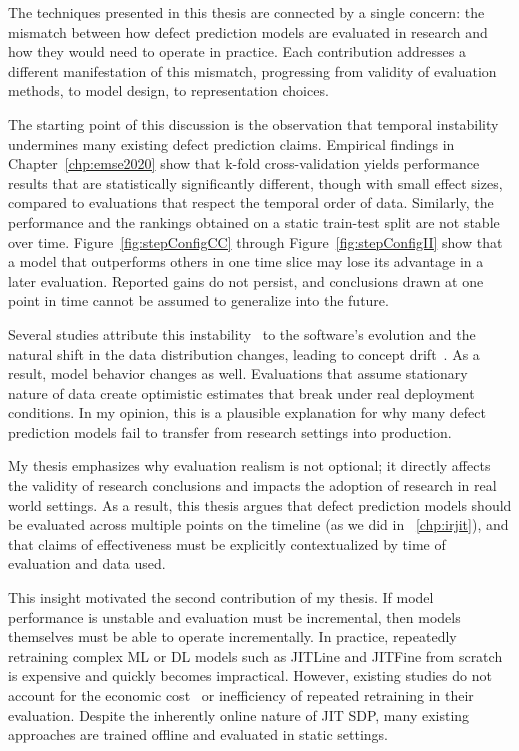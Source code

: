 \documentclass[\main/thesis.tex]{subfiles}
\begin{document}
The techniques presented in this thesis are connected by a single concern: the mismatch between how defect prediction models are evaluated in research and how they would need to operate in practice. Each contribution addresses a different manifestation of this mismatch, progressing from validity of evaluation methods, to model design, to representation choices.

The starting point of this discussion is the observation that temporal instability undermines many existing defect prediction claims. Empirical findings in Chapter~\ref{chp:emse2020} show that k-fold cross-validation yields performance results that are statistically significantly different, though with small effect sizes, compared to evaluations that respect the temporal order of data.
Similarly, the performance and the rankings obtained on a static train-test split are not stable over time. Figure~\ref{fig:stepConfigCC} through Figure~\ref{fig:stepConfigII} show that a model that outperforms others in one time slice may lose its advantage in a later evaluation. Reported gains do not persist, and conclusions drawn at one point in time cannot be assumed to generalize into the future.

Several studies attribute this instability~\cite{bangash2020time,ekanayake2009} to the software's evolution and the natural shift in the data distribution changes, leading to concept drift~\cite{cabral2019class,tan2015online}. As a result, model behavior changes as well. Evaluations that assume stationary nature of data create optimistic estimates that break under real deployment conditions.
In my opinion, this is a plausible explanation for why many defect prediction models fail to transfer from research settings into production. 

My thesis emphasizes why evaluation realism is not optional; it directly affects the validity of research conclusions and impacts the adoption of research in real world settings. As a result, this thesis argues that defect prediction models should be evaluated across multiple points on the timeline (as we did in ~\ref{chp:irjit}), and that claims of effectiveness must be explicitly contextualized by time of evaluation and data used.

This insight motivated the second contribution of my thesis. If model performance is unstable and evaluation must be incremental, then models themselves must be able to operate incrementally. In practice, repeatedly retraining complex ML or DL models such as JITLine and JITFine from scratch is expensive and quickly becomes impractical. 
However, existing studies do not account for the economic cost~\cite{herbold2021exploring} or inefficiency of repeated retraining in their evaluation.
Despite the inherently online nature of JIT SDP, many existing approaches are trained offline and evaluated in static settings.
\end{document}
